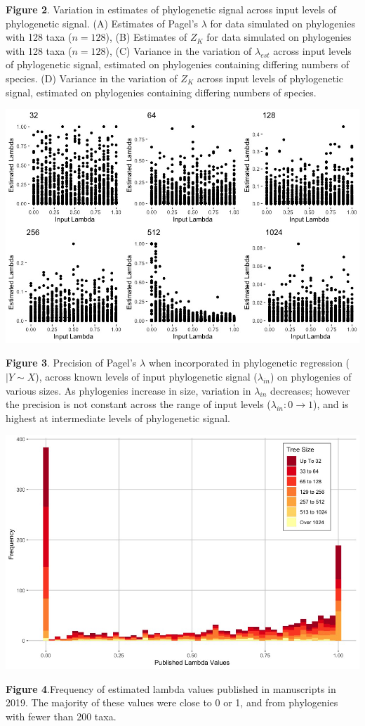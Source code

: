 \documentclass[
]{article}
\begin{document}
\singlespacing \textbf{Figure 2}. Variation in estimates of phylogenetic
signal across input levels of phylogenetic signal. (A) Estimates of
Pagel's \(\lambda\) for data simulated on phylogenies with 128 taxa
(\(n=128\)), (B) Estimates of \(Z_K\) for data simulated on phylogenies
with 128 taxa (\(n=128\)), (C) Variance in the variation of
\(\lambda_{est}\) across input levels of phylogenetic signal, estimated
on phylogenies containing differing numbers of species. (D) Variance in
the variation of \(Z_K\) across input levels of phylogenetic signal,
estimated on phylogenies containing differing numbers of species.

\newpage

\includegraphics[width=0.95\linewidth]{Fig3}

\singlespacing \textbf{Figure 3}. Precision of Pagel's \(\lambda\) when
incorporated in phylogenetic regression (\(|Y\sim X\)), across known
levels of input phylogenetic signal (\(\lambda_{in}\)) on phylogenies of
various sizes. As phylogenies increase in size, variation in
\(\lambda_{in}\) decreases; however the precision is not constant across
the range of input levels (\(\lambda_{in}: 0 \to 1\)), and is highest at
intermediate levels of phylogenetic signal.

\newpage

\includegraphics[width=0.95\linewidth]{Fig4}

\singlespacing \textbf{Figure 4}.Frequency of estimated lambda values
published in manuscripts in 2019. The majority of these values were
close to 0 or 1, and from phylogenies with fewer than 200 taxa.
\end{document}
